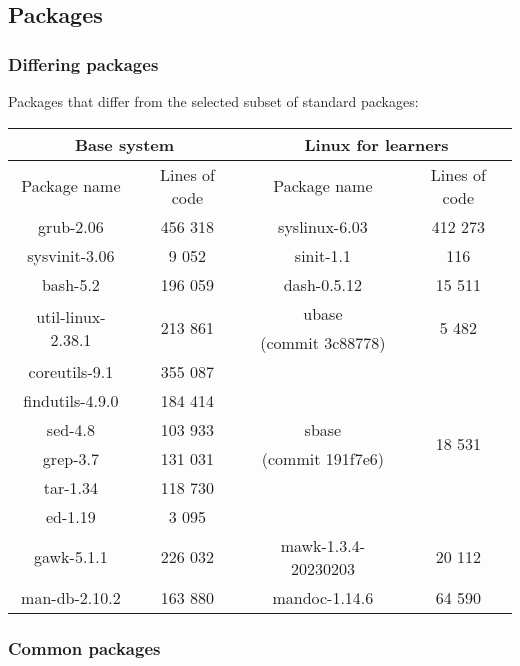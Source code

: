 \subsection{Packages}\label{Packages}

\subsubsection{Differing packages}

Packages that differ from the selected subset of standard packages:

\begin{center}
    \begin{tabular}{|c|c||c|c|}
        \hline
        \multicolumn{2}{|c||}{Base system} & \multicolumn{2}{|c|}{Linux for learners} \\
        \hline
        \hline
        Package name & Lines of code & Package name & Lines of code \\
        \hline
        \hline
        grub-2.06 & 456 318 & syslinux-6.03 & 412 273 \\
        \hline
        sysvinit-3.06 & 9 052 & sinit-1.1 & 116 \\
        \hline
        bash-5.2 & 196 059 & dash-0.5.12 & 15 511 \\
        \hline
        \multirow{2}{*}{util-linux-2.38.1} & \multirow{2}{*}{213 861} & ubase & \multirow{2}{*}{5 482} \\
        & & (commit 3c88778) & \\
        \hline
        coreutils-9.1 & 355 087 & & \multirow{6}{*}{18 531} \\
        findutils-4.9.0 & 184 414 & & \\
        sed-4.8 & 103 933 & sbase & \\
        grep-3.7 & 131 031 & (commit 191f7e6) & \\
        tar-1.34 & 118 730 & & \\
        ed-1.19 & 3 095 & & \\
        \hline
        gawk-5.1.1 & 226 032 & mawk-1.3.4-20230203 & 20 112 \\
        \hline
        man-db-2.10.2 & 163 880 & mandoc-1.14.6 & 64 590 \\
        \hline
    \end{tabular}
\end{center}

\subsubsection{Common packages}

